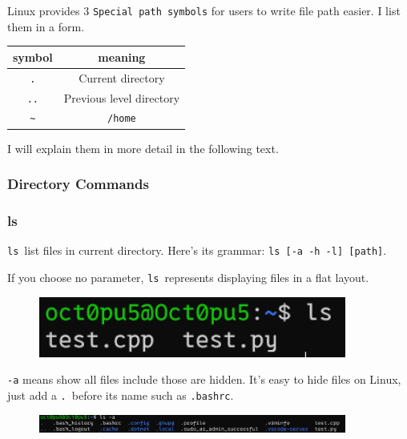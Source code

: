 \documentclass[12pt]{ctexart}
\begin{document}
Linux provides 3 \texttt{Special\ path\ symbols} for users to write file
path easier. I list them in a form.

\begin{table}[H]
    \centering
    \begin{tabular}{cc}
    \toprule
    symbol & meaning \\
    \midrule
    \texttt{.} & Current directory \\
    \texttt{..} & Previous level directory \\
    \texttt{\textasciitilde{}} & \texttt{/home} \\
    \bottomrule
    \end{tabular}
\end{table}
I will explain them in more detail in the following text.

\subsubsection{\textbf{Directory Commands}}

\subsubsection*{\textbf{ls}}

\texttt{ls}\ list files in current directory. Here's its
grammar: \texttt{ls\ {[}-a\ -h\ -l{]}\ {[}path{]}}.

If you choose no parameter, \texttt{ls}\ represents displaying files in a
flat layout.

\begin{figure}[H]
    \centering
    \includegraphics[width=0.9\textwidth,keepaspectratio]{assets/Linux/1.4 Linux directory structure and command/1.png}
\end{figure}

\texttt{-a} means show all files include those are hidden.
It's easy to hide files on Linux, just add a \texttt{.}\
before its name such as \texttt{.bashrc}.

\begin{figure}[H]
    \centering
    \includegraphics[width=0.9\textwidth,keepaspectratio]{assets/Linux/1.4 Linux directory structure and command/2.png}
\end{figure}
\end{document}
